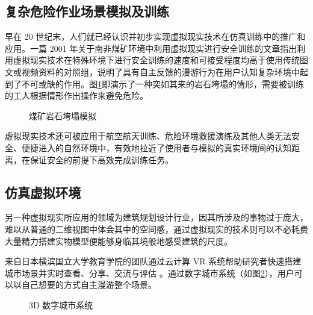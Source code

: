 \subsection{复杂危险作业场景模拟及训练}

早在 20 世纪末，人们就已经认识并初步实现虚拟现实技术在仿真训练中的推广和应用。一篇 2001 年关于南非煤矿环境中利用虚拟现实进行安全训练的文章指出利用虚拟现实技术在特殊环境下进行安全训练的速度和可接受程度均高于使用传统图文或视频资料的对照组，说明了具有自主反馈的漫游行为在用户认知复杂环境中起到了不可或缺的作用。图\ref{fig:mine}即演示了一种突如其来的岩石垮塌的情形，需要被训练的工人根据情形作出操作来避免危险。

\begin{figure}[htp]
\centering
{}
\caption{煤矿岩石垮塌模拟}
\label{fig:mine}
\end{figure}

虚拟现实技术还可被应用于航空航天训练、危险环境救援演练及其他人类无法安全、便捷进入的自然环境中，有效地拉近了使用者与模拟的真实环境间的认知距离，在保证安全的前提下高效完成训练任务。

\subsection{仿真虚拟环境}

另一种虚拟现实所应用的领域为建筑规划设计行业，因其所涉及的事物过于庞大，难以从普通的二维视图中体会其中的空间感，通过虚拟现实的技术则可以不必耗费大量精力搭建实物模型便能够身临其境般地感受建筑的尺度。

来自日本横滨国立大学教育学院的团队通过云计算 VR 系统帮助研究者快速搭建城市场景并实时查看、分享、交流与评估
。通过数字城市系统（如图\ref{fig:urban}），用户可以以自己想要的方式自主漫游整个场景。

\begin{figure}[htp]
\centering
{}
\caption{3D 数字城市系统}
\label{fig:urban}
\end{figure}

